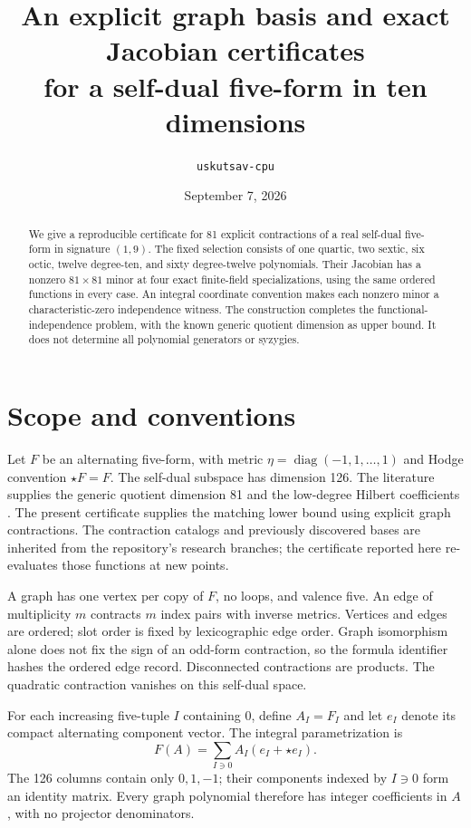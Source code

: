 \documentclass[11pt]{article}
\title{An explicit graph basis and exact Jacobian certificates\\
for a self-dual five-form in ten dimensions}
\author{\texttt{uskutsav-cpu}}
\date{September 7, 2026}
\begin{document}
\maketitle
\begin{abstract}
We give a reproducible certificate for 81 explicit contractions of a real
self-dual five-form in signature $(1,9)$. The fixed selection consists of one
quartic, two sextic, six octic, twelve degree-ten, and sixty degree-twelve
polynomials. Their Jacobian has a nonzero $81\times81$ minor at four exact
finite-field specializations, using the same ordered functions in every
case. An integral coordinate convention makes each nonzero minor a
characteristic-zero independence witness. The construction completes the
functional-independence problem, with the known generic quotient dimension
as upper bound. It does not determine all polynomial generators or syzygies.
\end{abstract}

\section{Scope and conventions}
Let $F$ be an alternating five-form, with metric
$\eta=\operatorname{diag}(-1,1,\ldots,1)$ and Hodge convention
$\star F=F$. The self-dual subspace has dimension 126.
The literature supplies the generic quotient dimension 81 and the
low-degree Hilbert coefficients \cite{cederwall,hutomo}. The present
certificate supplies the matching lower bound using explicit graph
contractions. The contraction catalogs and previously discovered bases are
inherited from the repository's research branches; the certificate reported
here re-evaluates those functions at new points.

A graph has one vertex per copy of $F$, no loops, and valence five.
An edge of multiplicity $m$ contracts $m$ index pairs with inverse metrics.
Vertices and edges are ordered; slot order is fixed by lexicographic edge
order. Graph isomorphism alone does not fix the sign of an odd-form
contraction, so the formula identifier hashes the ordered edge record.
Disconnected contractions are products. The quadratic contraction vanishes
on this self-dual space.

For each increasing five-tuple $I$ containing 0, define
$A_I=F_I$ and let $e_I$ denote its compact alternating component vector.
The integral parametrization is
\[
 F(A)=\sum_{I\ni0} A_I(e_I+\star e_I).
\]
The 126 columns contain only $0,1,-1$; their components indexed by $I\ni0$
form an identity matrix. Every graph polynomial therefore has integer
coefficients in $A$, with no projector denominators.
\end{document}
